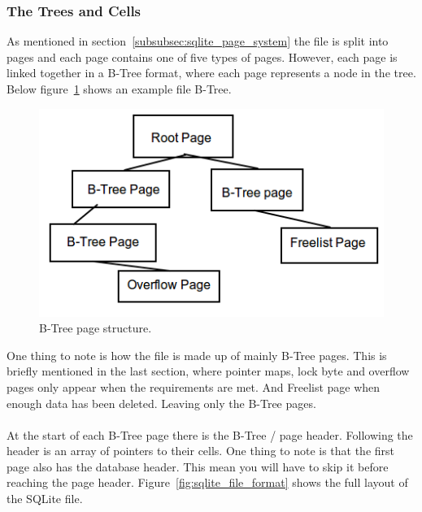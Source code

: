 \subsubsection{The Trees and Cells}
\label{subsubsec:sqlite_trees_and_cells}

As mentioned in section~\ref{subsubsec:sqlite_page_system} the file is split into pages and each page contains one of five types of pages. However, each page is linked together in a B-Tree format, where each page represents a node in the tree. Below figure~\ref{fig:sqlite_btree_figure} shows an example file B-Tree.

\begin{figure}[H]
	\centering
	\includegraphics[scale=0.5]{images/sqlite_btree_format.png}
	\caption{B-Tree page structure.}
	\label{fig:sqlite_btree_figure}
\end{figure}

One thing to note is how the file is made up of mainly B-Tree pages. This is briefly mentioned in the last section, where pointer maps, lock byte and overflow pages only appear when the requirements are met. And Freelist page when enough data has been deleted. Leaving only the B-Tree pages.
\\\\
At the start of each B-Tree page there is the B-Tree / page header. Following the header is an array of pointers to their cells. One thing to note is that the first page also has the database header. This mean you will have to skip it before reaching the page header. Figure~\ref{fig:sqlite_file_format} shows the full layout of the SQLite file.

